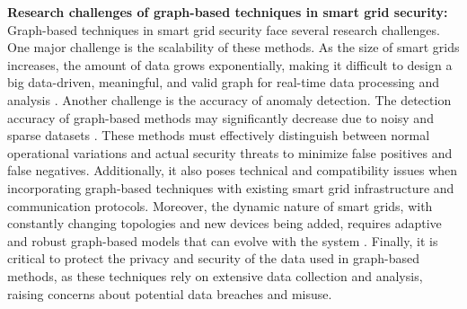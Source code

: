 \documentclass[10pt, journal]{IEEEtran}
\begin{document}



{\bf Research challenges of graph-based techniques in smart grid security:} Graph-based techniques in smart grid security face several research challenges. One major challenge is the scalability of these methods. As the size of smart grids increases, the amount of data grows exponentially, making it difficult to design a big data-driven, meaningful, and valid graph for real-time data processing and analysis \cite{wang2013cyber,akoglu2015graph}. Another challenge is the accuracy of anomaly detection. The detection accuracy of graph-based methods may significantly decrease due to noisy and sparse datasets \cite{ranshous2015anomaly, yanmei2024enhanced}. These methods must effectively distinguish between normal operational variations and actual security threats to minimize false positives and false negatives. Additionally, it also poses technical and compatibility issues when incorporating graph-based techniques with existing smart grid infrastructure and communication protocols. Moreover, the dynamic nature of smart grids, with constantly changing topologies and new devices being added, requires adaptive and robust graph-based models that can evolve with the system \cite{cai2021structural, akoglu2015graph}. Finally, it is critical to protect the privacy and security of the data used in graph-based methods, as these techniques rely on extensive data collection and analysis, raising concerns about potential data breaches and misuse.
\end{document}
